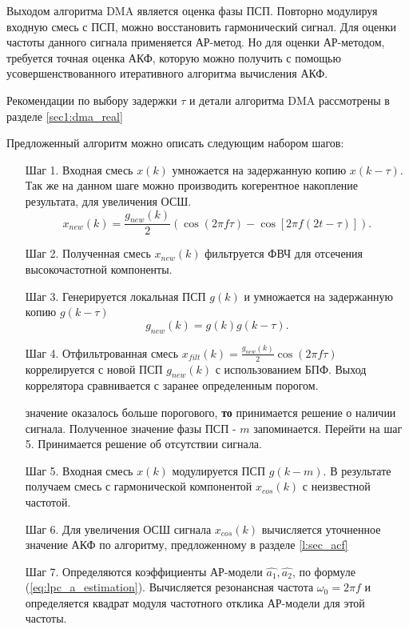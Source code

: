 Выходом алгоритма DMA является оценка фазы ПСП. Повторно модулируя входную смесь с ПСП, можно восстановить гармонический сигнал. Для оценки частоты данного сигнала применяется
АР-метод. Но для оценки АР-методом, требуется точная оценка АКФ, которую можно получить
с помощью усовершенствованного итеративного алгоритма вычисления АКФ.

Рекомендации по выбору задержки ${\tau}$ и детали алгоритма DMA рассмотрены в разделе \ref{sec1:dma_real}

Предложенный алгоритм можно описать следующим набором шагов:
\begin{itemize}[align=left,style=nextline,leftmargin=*,labelsep=\parindent,font=\normalfont]
\item[Шаг 1.] Входная смесь ${x(k)}$ умножается на задержанную копию ${x(k-\tau)}$. Так же
	на данном шаге можно производить когерентное накопление результата, для
	увеличения ОСШ.
	\begin{equation}
		x_{new}(k) = \frac{g_{new}(k)}{2} \left(\cos (2\pi f \tau) - \cos \left[2 \pi f (2t - \tau)\right]\right).
	\end{equation}

\item[Шаг 2.] Полученная смесь ${x_{new}(k)}$ фильтруется ФВЧ для отсечения высокочастотной компоненты.
\item[Шаг 3.] Генерируется локальная ПСП ${g(k)}$ и умножается на задержанную копию ${g(k-\tau)}$
	\begin{equation}
		g_{new}(k) = g(k)g(k-\tau).
	\end{equation}

\item[Шаг 4.] Отфильтрованная смесь ${x_{filt}(k) = \frac{g_{new}(k)}{2} \cos (2\pi f \tau)}$ коррелируется с новой ПСП ${g_{new}(k)}$
	с использованием БПФ. Выход коррелятора сравнивается с заранее определенным порогом.

	  значение оказалось больше порогового, {\bf{то}}
		принимается решение о наличии сигнала. Полученное значение фазы ПСП  - ${m}$ запоминается.
		Перейти на шаг 5.
		Принимается решение об отсутствии сигнала.
\item[Шаг 5.] Входная смесь ${x(k)}$ модулируется ПСП ${g(k-m)}$. В результате получаем смесь с гармонической компонентой 
	${x_{cos}(k)}$ с неизвестной частотой.
\item[Шаг 6.] Для увеличения ОСШ сигнала ${x_{cos}(k)}$ вычисляется уточненное значение АКФ
	по алгоритму, предложенному в разделе \ref{l:sec_acf}
\item[Шаг 7.] Определяются коэффициенты АР-модели ${\hat{a_1}, \hat{a_2}}$, по формуле \mbox{(\ref{eq:lpc_a_estimation}).} 
	Вычисляется резонансная частота ${\omega_0 = 2 \pi f}$ и определяется квадрат модуля частотного отклика АР-модели для этой частоты. 
\end{itemize}

